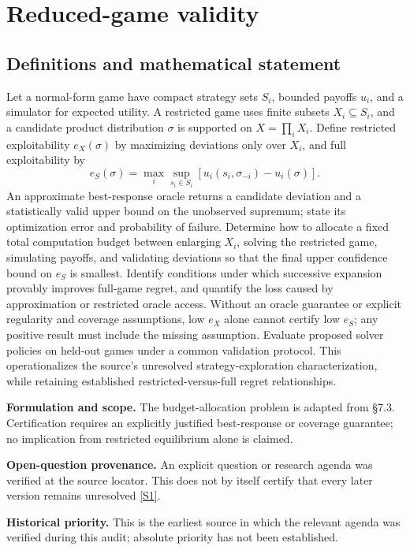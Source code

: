 \documentclass[11pt]{article}
\newcommand{\sref}[2]{\hyperlink{source:#1:#2}{[S#2]}}
\begin{document}
\section*{Reduced-game validity}\label{30007571}
\subsection{Definitions and mathematical statement}
Let a normal-form game have compact strategy sets \(S_i\), bounded payoffs \(u_i\), and a simulator for expected utility. A restricted game uses finite subsets \(X_i\subseteq S_i\), and a candidate product distribution \(\sigma\) is supported on \(X=\prod_iX_i\). Define restricted exploitability \(e_X(\sigma)\) by maximizing deviations only over \(X_i\), and full exploitability by
\[
 e_S(\sigma)=\max_i\sup_{s_i\in S_i}
 [u_i(s_i,\sigma_{-i})-u_i(\sigma)].
\]
An approximate best-response oracle returns a candidate deviation and a statistically valid upper bound on the unobserved supremum; state its optimization error and probability of failure. Determine how to allocate a fixed total computation budget between enlarging \(X_i\), solving the restricted game, simulating payoffs, and validating deviations so that the final upper confidence bound on \(e_S\) is smallest. Identify conditions under which successive expansion provably improves full-game regret, and quantify the loss caused by approximation or restricted oracle access. Without an oracle guarantee or explicit regularity and coverage assumptions, low \(e_X\) alone cannot certify low \(e_S\); any positive result must include the missing assumption. Evaluate proposed solver policies on held-out games under a common validation protocol. This operationalizes the source’s unresolved strategy-exploration characterization, while retaining established restricted-versus-full regret relationships.

\par\textbf{Formulation and scope.} The budget-allocation problem is adapted from §7.3. Certification requires an explicitly justified best-response or coverage guarantee; no implication from restricted equilibrium alone is claimed.

\par\textbf{Open-question provenance.} An explicit question or research agenda was verified at the source locator. This does not by itself certify that every later version remains unresolved \sref{30007571}{1}.

\par\textbf{Historical priority.} This is the earliest source in which the relevant agenda was verified during this audit; absolute priority has not been established.
\end{document}
